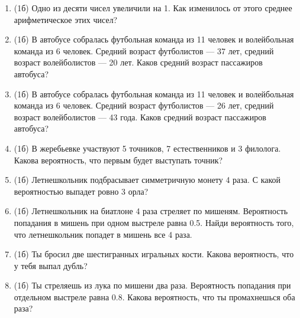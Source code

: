 \documentclass[a4paper, 12pt]{article}
\begin{document}
\begin{enumerate}
\item (1б) Одно из десяти чисел увеличили на 1. Как изменилось от этого среднее арифметическое этих чисел?
\item (1б) В автобусе собралась футбольная команда из 11 человек и волейбольная команда из 6 человек. Средний возраст футболистов — 37 лет, средний возраст волейболистов — 20 лет. Каков средний возраст пассажиров автобуса?
\item (1б) В автобусе собралась футбольная команда из 11 человек и волейбольная команда из 6 человек. Средний возраст футболистов — 26 лет, средний возраст волейболистов — 43 года. Каков средний возраст пассажиров автобуса?
\item (1б) В жеребьевке участвуют 5 точников, 7 естественников и 3 филолога.
Какова вероятность, что первым будет выступать точник?
\item (1б) Летнешкольник подбрасывает симметричную монету 4 раза.
С какой вероятностью выпадет ровно 3 орла?
\item (1б) Летнешкольник на биатлоне 4 раза стреляет по мишеням.
Вероятность попадания в мишень при одном выстреле равна 0.5.
Найди вероятность того, что летнешкольник попадет в мишень все 4 раза.
\item (1б) Ты бросил две шестигранных игральных кости. Какова вероятность, что у тебя выпал дубль?
\item (1б) Ты стреляешь из лука по мишени два раза. Вероятность попадания при отдельном выстреле равна 0.8.
Какова вероятность, что ты промахнешься оба раза?

\end{enumerate}
\end{document}
